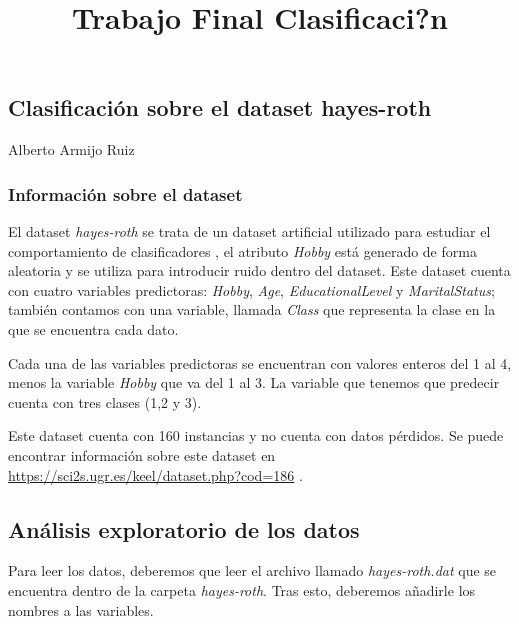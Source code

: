 \documentclass[11pt]{article}
\title{Trabajo Final Clasificaci?n}
\begin{document}
    
    
    \maketitle
    
    

    
    \hypertarget{clasificaciuxf3n-sobre-el-dataset-hayes-roth}{%
\subsection{Clasificación sobre el dataset
hayes-roth}\label{clasificaciuxf3n-sobre-el-dataset-hayes-roth}}

Alberto Armijo Ruiz

    \hypertarget{informaciuxf3n-sobre-el-dataset}{%
\subsubsection{Información sobre el
dataset}\label{informaciuxf3n-sobre-el-dataset}}

El dataset \emph{hayes-roth} se trata de un dataset artificial utilizado
para estudiar el comportamiento de clasificadores , el atributo
\emph{Hobby} está generado de forma aleatoria y se utiliza para
introducir ruido dentro del dataset. Este dataset cuenta con cuatro
variables predictoras: \emph{Hobby}, \emph{Age}, \emph{EducationalLevel}
y \emph{MaritalStatus}; también contamos con una variable, llamada
\emph{Class} que representa la clase en la que se encuentra cada dato.

Cada una de las variables predictoras se encuentran con valores enteros
del 1 al 4, menos la variable \emph{Hobby} que va del 1 al 3. La
variable que tenemos que predecir cuenta con tres clases (1,2 y 3).

Este dataset cuenta con 160 instancias y no cuenta con datos pérdidos.
Se puede encontrar información sobre este dataset en
\url{https://sci2s.ugr.es/keel/dataset.php?cod=186} .

    \hypertarget{anuxe1lisis-exploratorio-de-los-datos}{%
\subsection{Análisis exploratorio de los
datos}\label{anuxe1lisis-exploratorio-de-los-datos}}

Para leer los datos, deberemos que leer el archivo llamado
\emph{hayes-roth.dat} que se encuentra dentro de la carpeta
\emph{hayes-roth}. Tras esto, deberemos añadirle los nombres a las
variables.
\end{document}
